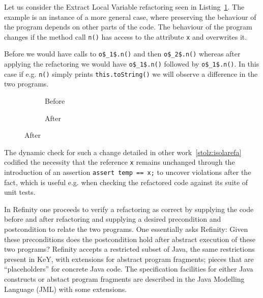 \newcommand\jcode[1]{\lstinline[style=smallJava]|#1|}
\newcommand\rcode[1]{\lstinline[style=refinity]|#1|}
\newcommand\jmcode[1]{\lstinline[mathescape=true,style=smallJava]|#1|}
\newcommand\rmcode[1]{\lstinline[mathescape=true,style=refinity]|#1|}

Let us consider the Extract Local Variable refactoring seen in Listing~\ref{lst:ExtractVariable-java}.
The example is an instance of a more general case, where preserving the behaviour of the program depends on other parts of the code.
The behaviour of the program changes if the method call \jcode{n()} has access to the attribute \jcode{x} and overwrites it.

Before we would have calls to \jmcode{o$_1$.n()} and then \jmcode{o$_2$.n()} whereas after applying the refactoring we would
have \jmcode{o$_1$.n()} followed by \jmcode{o$_1$.n()}. In this case if e.g. \jcode{n()} simply prints \jcode{this.toString()} we will
observe a difference in the two programs.

\begin{figure}[!h]
  \centering
  \begin{subfigure}{.2\linewidth}
    
    \caption{Before}
  \end{subfigure}\hspace{1cm}
  \begin{subfigure}{.3\linewidth}
    
    \caption{After}
  \end{subfigure}
\label{lst:ExtractVariable-java}
\end{figure}

The dynamic check for such a change detailed in other work~\ref{stolz:isolarefa} codified the necessity that the reference \jcode{x}
remains unchanged through the introduction of an assertion \jcode{assert temp == x;} to uncover violations after the fact,
which is useful e.g. when checking the refactored code against its suite of unit tests.

In Refinity one proceeds to verify a refactoring as correct by supplying the code before and after refactoring and supplying a desired precondition and postcondition to relate
the two programs. One essentially asks Refinity: Given these preconditions does the postcondition hold after abstract execution of these two programs? Refinity accepts a restricted
subset of Java, the same restrictions present in KeY, with extensions for abstract program fragments; pieces that are ``placeholders'' for concrete Java code.
The specification facilities for either Java constructs or abstact program fragments are described in the Java Modelling Language (JML) with some extensions.

